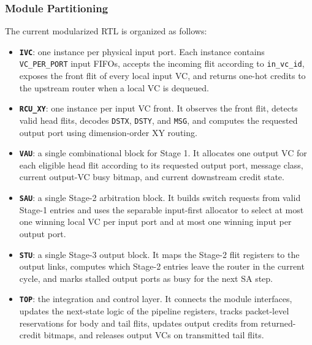 \documentclass[11pt,a4paper]{article}
\begin{document}
\subsubsection{Module Partitioning}
The current modularized RTL is organized as follows:
\begin{itemize}
    \item \textbf{\texttt{IVC}}: one instance per physical input port. Each instance contains \texttt{VC\_PER\_PORT} input FIFOs, accepts the incoming flit according to \texttt{in\_vc\_id}, exposes the front flit of every local input VC, and returns one-hot credits to the upstream router when a local VC is dequeued.
    \item \textbf{\texttt{RCU\_XY}}: one instance per input VC front. It observes the front flit, detects valid head flits, decodes \texttt{DSTX}, \texttt{DSTY}, and \texttt{MSG}, and computes the requested output port using dimension-order XY routing.
    \item \textbf{\texttt{VAU}}: a single combinational block for Stage 1. It allocates one output VC for each eligible head flit according to its requested output port, message class, current output-VC busy bitmap, and current downstream credit state.
    \item \textbf{\texttt{SAU}}: a single Stage-2 arbitration block. It builds switch requests from valid Stage-1 entries and uses the separable input-first allocator to select at most one winning local VC per input port and at most one winning input per output port.
    \item \textbf{\texttt{STU}}: a single Stage-3 output block. It maps the Stage-2 flit registers to the output links, computes which Stage-2 entries leave the router in the current cycle, and marks stalled output ports as busy for the next SA step.
    \item \textbf{\texttt{TOP}}: the integration and control layer. It connects the module interfaces, updates the next-state logic of the pipeline registers, tracks packet-level reservations for body and tail flits, updates output credits from returned-credit bitmaps, and releases output VCs on transmitted tail flits.
\end{itemize}
\end{document}
